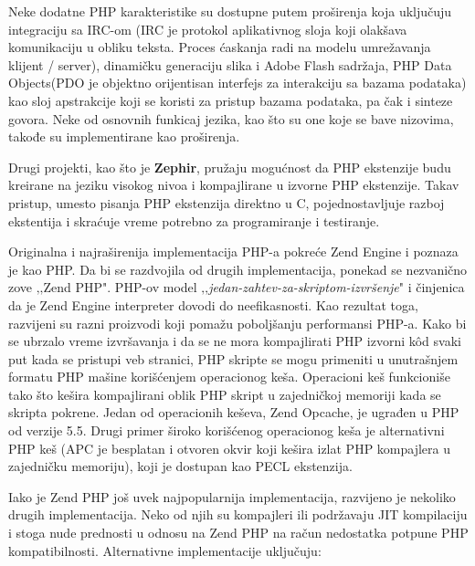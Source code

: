 \documentclass[a4paper]{article}
\begin{document}
{Neke dodatne PHP karakteristike su dostupne putem proširenja koja uključuju integraciju sa IRC-om (IRC je protokol aplikativnog sloja koji
olakšava komunikaciju u obliku teksta. Proces ćaskanja radi na modelu umrežavanja klijent / server), dinamičku generaciju slika i Adobe Flash sadržaja, PHP Data Objects(PDO je objektno orijentisan interfejs za interakciju sa bazama podataka) kao sloj apstrakcije koji se koristi za pristup bazama podataka, pa čak i sinteze govora. Neke od osnovnih funkicaj jezika, kao što su one koje se bave nizovima, takođe su implementirane kao proširenja\cite{corePHP}.

Drugi projekti, kao što je \textbf{Zephir}\cite{zephir}, pružaju mogućnost da PHP ekstenzije budu kreirane na jeziku visokog nivoa i kompajlirane u izvorne PHP ekstenzije. Takav pristup, umesto pisanja PHP ekstenzija direktno u C, pojednostavljuje razboj ekstentija i skraćuje vreme potrebno za programiranje i testiranje.

Originalna i najraširenija implementacija PHP-a pokreće Zend Engine i poznaza je kao PHP. Da bi se razdvojila od drugih implementacija, ponekad se nezvanično zove ‚‚Zend PHP". PHP-ov model ‚‚\textit{jedan-zahtev-za-skriptom-izvršenje}" i činjenica da je Zend Engine interpreter dovodi do neefikasnosti. Kao rezultat toga, razvijeni su razni proizvodi koji pomažu poboljšanju performansi PHP-a. Kako bi se ubrzalo vreme izvršavanja i da se ne mora kompajlirati PHP izvorni k\^{o}d svaki put kada se pristupi veb stranici, PHP skripte se mogu primeniti u unutrašnjem formatu PHP mašine korišćenjem operacionog keša. Operacioni keš funkcioniše tako što kešira kompajlirani oblik PHP skript u zajedničkoj memoriji kada se skripta pokrene. Jedan od operacionih keševa, Zend Opcache\cite{zend}, je ugrađen u PHP od verzije 5.5. Drugi primer široko korišćenog operacionog keša je alternativni PHP keš (APC je besplatan i otvoren okvir koji kešira izlat PHP kompajlera u zajedničku memoriju)\cite{php}, koji je dostupan kao PECL ekstenzija.

Iako je Zend PHP još uvek najpopularnija implementacija, razvijeno je nekoliko drugih implementacija. Neko od njih su kompajleri ili podržavaju
JIT\cite{jit} kompilaciju i stoga nude prednosti u odnosu na Zend PHP na račun nedostatka potpune PHP kompatibilnosti. Alternativne implementacije uključuju:

}
\end{document}
